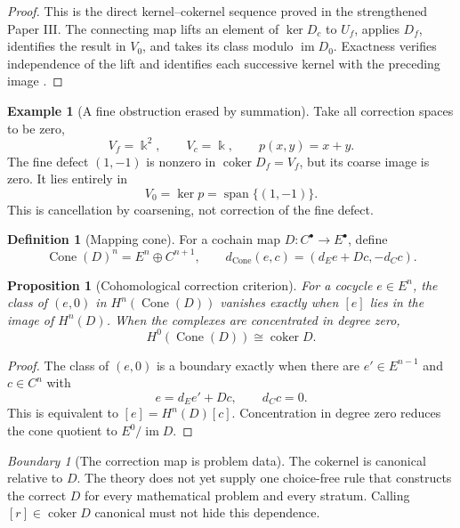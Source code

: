 \documentclass[11pt]{article}
\newtheorem{proposition}[theorem]{Proposition}
\theoremstyle{definition}
\newtheorem{definition}[theorem]{Definition}
\newtheorem{example}[theorem]{Example}
\theoremstyle{remark}
\newtheorem{boundary}[theorem]{Boundary}
\DeclareMathOperator{\coker}{coker}
\DeclareMathOperator{\im}{im}
\DeclareMathOperator{\Span}{span}
\DeclareMathOperator{\Cone}{Cone}
\newcommand{\kk}{\Bbbk}
\begin{document}
\begin{proof}
This is the direct kernel--cokernel sequence proved in the strengthened Paper III.  The connecting map lifts an element of \(\ker D_c\) to \(U_f\), applies \(D_f\), identifies the result in \(V_0\), and takes its class modulo \(\im D_0\).  Exactness verifies independence of the lift and identifies each successive kernel with the preceding image \cite{P3,MIG}.
\end{proof}

\begin{example}[A fine obstruction erased by summation]
\label{ex:fine-obstruction-erased}
Take all correction spaces to be zero,
\[
V_f=\kk^2,
\qquad
V_c=\kk,
\qquad
p(x,y)=x+y.
\]
The fine defect \((1,-1)\) is nonzero in \(\coker D_f=V_f\), but its coarse image is zero.  It lies entirely in
\[
V_0=\ker p=\Span\{(1,-1)\}.
\]
This is cancellation by coarsening, not correction of the fine defect.
\end{example}

\begin{definition}[Mapping cone]
\label{def:block02-mapping-cone}
For a cochain map \(D:C^\bullet\to E^\bullet\), define
\[
\Cone(D)^n=E^n\oplus C^{n+1},
\qquad
 d_{\Cone}(e,c)=(d_Ee+Dc,-d_Cc).
\]
\end{definition}

\begin{proposition}[Cohomological correction criterion]
\label{prop:block02-cone-obstruction}
For a cocycle \(e\in E^n\), the class of \((e,0)\) in \(H^n(\Cone(D))\) vanishes exactly when \([e]\) lies in the image of \(H^n(D)\).  When the complexes are concentrated in degree zero,
\[
H^0(\Cone(D))\cong\coker D.
\]
\end{proposition}

\begin{proof}
The class of \((e,0)\) is a boundary exactly when there are \(e'\in E^{n-1}\) and \(c\in C^n\) with
\[
e=d_Ee'+Dc,
\qquad
d_Cc=0.
\]
This is equivalent to \([e]=H^n(D)[c]\).  Concentration in degree zero reduces the cone quotient to \(E^0/\im D\).
\end{proof}

\begin{boundary}[The correction map is problem data]
\label{bnd:correction-map-problem-data}
The cokernel is canonical relative to \(D\).  The theory does not yet supply one choice-free rule that constructs the correct \(D\) for every mathematical problem and every stratum.  Calling \([r]\in\coker D\) canonical must not hide this dependence.
\end{boundary}
\end{document}
